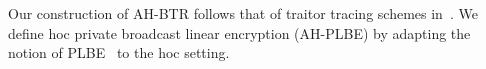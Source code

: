Our construction of AH-BTR follows that of traitor tracing schemes in~\cite{EC:BonSahWat06}.
We define \ad hoc private broadcast linear encryption (AH-PLBE) by adapting the notion of PLBE~\cite{EC:BonSahWat06} to the \ad hoc setting.
